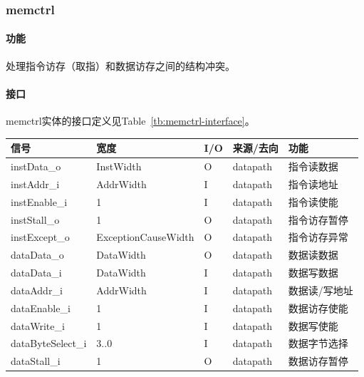 \documentclass{article}
\begin{document}
\begin{spacing}{1.4}
\subsubsection{memctrl}

\paragraph{功能}\mbox{}

处理指令访存（取指）和数据访存之间的结构冲突。

\paragraph{接口}\mbox{}

memctrl实体的接口定义见Table~\ref{tb:memctrl-interface}。
\begin{longtable}{l|l|l|l|p{5cm}}
\hline
\textbf{信号}&\textbf{宽度}&\textbf{I/O}&\textbf{来源/去向}&\textbf{功能} \\
\hline \endhead instData\_o    & InstWidth              & O     & datapath      & 指令读数据 \\
\hline instAddr\_i             & AddrWidth              & I     & datapath      & 指令读地址 \\
\hline instEnable\_i           & 1                      & I     & datapath      & 指令读使能 \\
\hline instStall\_o            & 1                      & O     & datapath      & 指令访存暂停 \\
\hline instExcept\_o           & ExceptionCauseWidth    & O     & datapath      & 指令访存异常 \\
\hline dataData\_o             & DataWidth              & O     & datapath      & 数据读数据 \\
\hline dataData\_i             & DataWidth              & I     & datapath      & 数据写数据 \\
\hline dataAddr\_i             & AddrWidth              & I     & datapath      & 数据读/写地址 \\
\hline dataEnable\_i           & 1                      & I     & datapath      & 数据访存使能 \\
\hline dataWrite\_i            & 1                      & I     & datapath      & 数据写使能 \\
\hline dataByteSelect\_i       & 3..0                   & I     & datapath      & 数据字节选择 \\
\hline dataStall\_i            & 1                      & O     & datapath      & 数据访存暂停 \\

\end{longtable}
\end{spacing}
\end{document}
